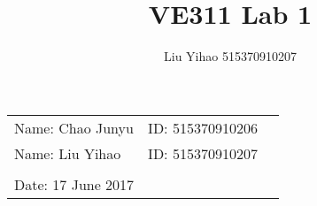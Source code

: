 \documentclass{article}
\title{VE311 Lab 1}
\author{Liu Yihao 515370910207}
\date{}
\begin{document}
\vspace*{0.25cm}

\hrulefill

\thispagestyle{empty}

\begin{center}
\begin{large}
\end{large}

\hrulefill

\vspace*{5cm}
\begin{Large}
\end{Large}

\vspace{2em}

\begin{large}
\end{large}
\end{center}

\vfill

\begin{table}[h!]
\flushleft
\begin{tabular}{lll}
Name: Chao Junyu \hspace*{2em}&
ID: 515370910206\hspace*{2em}\\
Name: Liu Yihao \hspace*{2em}&
ID: 515370910207\hspace*{2em}\\
\\

Date: 17 June 2017 

\end{tabular}
\end{table}

\hfill

\newpage
\end{document}
